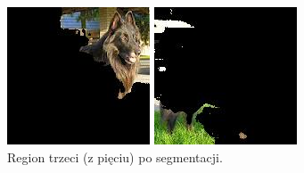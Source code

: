 \documentclass[10pt]{llncs}
\begin{document}
\begin{figure}[!htb]
  \includegraphics[width=\linewidth]{img/images_k5_2.jpg}
  \caption{Region trzeci (z pięciu) po segmentacji.}\label{fig:10}
\endminipage\hfill
{}
  \includegraphics[width=\linewidth]{img/images_k5_3.jpg}

\end{figure}
\end{document}
